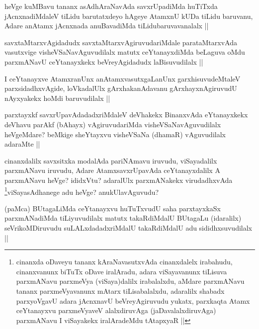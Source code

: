 \begin{artha}
heVge kuMBavu tananx asAdhAraNavAda savxrUpadiMda huTiTxda jAcnxnadiMdaleV tiLidu barutatxdeyo hAgeye AtamxnU kUDa tiLidu baruvanu, Adare anAtamx jAcnxnada anuBavadiMda tiLidubaruvavanalalx ||
\end{artha}

\begin{artha}
savxtaMtarxvAgidadudx savxtaMtarxvAgiruvudariMdale parataMtarxvAda vasutxvige visheVSaNavAguvudilalx matutx ceYtanayxdiMda beLaguva oMdu parxmANavU ceYtanayxkekx beVreyAgidadudx laBisuvudilalx ||
\end{artha}

\begin{artha}
I ceYtanayxve AtamxranUnx anAtamxvasutxgaLanUnx garxhisuvudeMtaleV parxsidadhxvAgide, loVkadalUlx gArxhakanAdavanu gArxhayxnAgiruvudU nAyxyakekx hoMdi baruvudilalx ||
\end{artha}

\begin{artha}
parxtayxkf savxrUpavAdadadxriMdaleV deVhakekx BinanxvAda eYtanayxkekx deVhavu parAkf (bAhayx) vAgiruvudariMda visheVSaNavAguvudilalx heVgeMdare? beMkige sheYtayxvu visheVSaNa (dhamaR) vAguvudilalx adaraMte ||
\end{artha}

\begin{artha}
cinanxdalilx savxsitxka modalAda pariNAmavu iruvudu, viSayadalilx parxmANavu iruvudu, Adare AtamxsavxrUpavAda ceYtanayxdalilx A parxmANavu heVge? ididxVtu? adaralUlx parxmANakekx virudadhxvAda \footnote{cinanxda oDaveyu tananx kAraNavasutxvAda cinanxdalelx irabahudu, cinanxvanunx biTuTx oDave iralAradu, adara viSayavanunx tiLisuva parxmANavu parxmeVya (viSaya)dalilx irabalalxdu, aMdare parxmANavu tananx parxmeVyavanunx mAtarx tiLisabalalxdu, adaralilx shabadx parxyoVgavU adara jAcnxnavU beVreyAgiruvudu yukatx, parxkaqta Atamx ceYtanayxvu parxmeVyaveV alalxdiruvAga (jaDavalalxdiruvAga) parxmANavu I viSayakekx iralAradeMdu tAtapxyaR ||}viSayasAdhanege adu heVge? anukUlavAguvudu?
\end{artha}

\begin{artha}
(paMca) BUtagaLiMda ceYtanayxvu huTuTxvudU saha parxtayxkaSx parxmANadiMda tiLiyuvudilalx matutx takaRdiMdalU BUtagaLu (idaralilx)  seVrikoMDiruvudu suLALxdadadxriMdalU takaRdiMdalU adu sididhxsuvudilalx ||
\end{artha}

